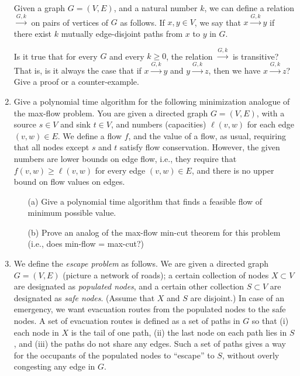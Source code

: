 \documentclass[12pt]{article}
\begin{document}
\begin{enumerate}
\def\lnk{{\stackrel{G,k}{\longrightarrow}}}

Given a graph $G = (V,E)$, and a natural number $k$,
we can define a relation $\lnk$ on pairs of vertices of $G$ as follows.
If $x, y \in V$, we say that $x \lnk y$ if there
exist $k$ mutually edge-disjoint paths from $x$ to $y$ in $G$.

Is it true that for every $G$ and every $k \geq 0$,
the relation $\lnk$ is transitive?
That is, is it always the case that if $x \lnk y$ and $y \lnk z$,
then we have $x \lnk z$?
Give a proof or a counter-example.



\item

Give a polynomial time algorithm for the following minimization analogue
of the max-flow problem.
You are given a directed graph $G=(V,E)$, with a source $s \in V$
and sink $t \in V$, and numbers (capacities) $\ell(v,w)$ for each edge
$(v,w) \in E$.
We define a flow $f$, and the value of a flow, as usual, requiring
that all nodes except $s$ and $t$ satisfy flow conservation.
However, the given numbers are lower bounds on edge flow,
i.e., they require that $f(v,w) \ge \ell(v,w)$ for every edge $(v,w) \in E$,
and there is no upper bound on flow values on edges.
\begin{itemize}
\item[(a)] Give a polynomial time algorithm that finds
a feasible flow of minimum possible value.
\item[(b)] Prove an analog of the max-flow min-cut theorem for this problem
(i.e., does min-flow = max-cut?)
\end{itemize}






\item

We define the {\em escape problem} as
follows.  We are given a directed graph $G = (V,E)$ (picture a
network of roads); a certain collection of nodes $X \subset V$
are designated as {\em populated nodes}, and a certain
other collection $S \subset V$ are designated as {\em safe nodes}.
(Assume that $X$ and $S$ are disjoint.)
In case of an emergency, we want evacuation routes
from the populated nodes to the safe nodes.
A set of evacuation routes is defined as a set
of paths in $G$ so that (i) each node in $X$ is the
tail of one path, (ii) the last node on each path lies in $S$, and
(iii) the paths do not share any edges.
Such a set of paths gives a way for the
occupants of the populated nodes to ``escape'' to $S$,
without overly congesting any edge in $G$.


\end{enumerate}
\end{document}
